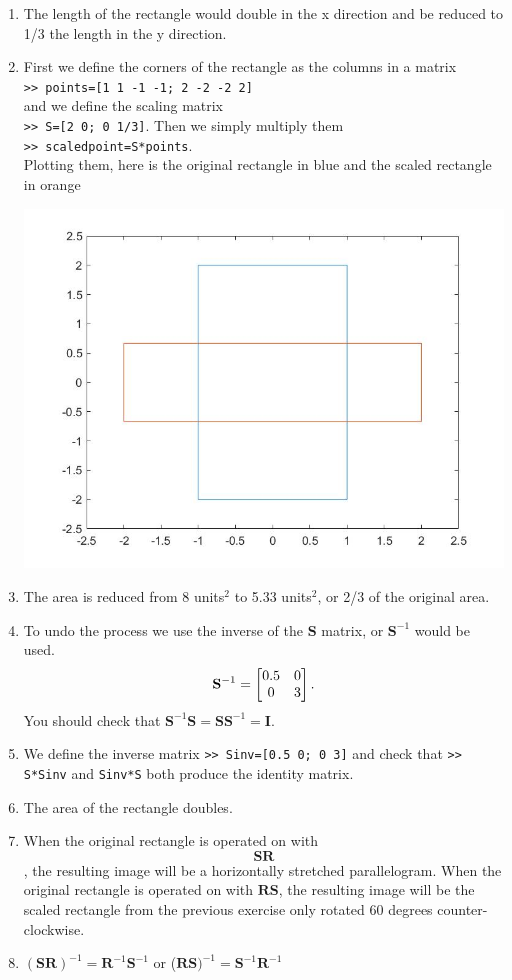 \begin{sol}
	\begin{enumerate}
		\item The length of the rectangle would double in the x direction and be reduced to 1/3 the length in the y direction.
		\item First we define the corners of the rectangle as the columns in a matrix\\
		{\centering \texttt{>> points=[1 1 -1 -1; 2 -2 -2 2]}}\\
		and we define the scaling matrix\\
		{\centering \texttt{>> S=[2 0; 0 1/3]}.}
		Then we simply multiply them\\
		{\centering \texttt{>> scaledpoint=S*points}.}\\
		Plotting them, here is the original rectangle in blue and the scaled rectangle in orange
		\begin{center}
		    \includegraphics[scale=.5]{FacesNight2/figs/scaledrec.jpg}
		\end{center}
		\item The area is reduced from 8 units$^2$ to 5.33 units$^2$, or 2/3 of the original area.
		\item To undo the process we use the inverse of the $\mathbf{S}$ matrix, or $\mathbf{S}^{-1}$ would be used. \[ \mathbf{S}^{-1} = \begin{bmatrix} 0.5 & 0 \\ 0 & 3\end{bmatrix}. \]
		You should check that $\mathbf{S}^{-1}\mathbf{S} = \mathbf{SS}^{-1} = \mathbf{I}$.
		\item We define the inverse matrix
		{\centering \texttt{>> Sinv=[0.5 0; 0 3]}}
		and check that \texttt{>> S*Sinv} and \texttt{Sinv*S} both produce the identity matrix.
		\item The area of the rectangle doubles.
		\item When the original rectangle is operated on with $$\mathbf{SR}$$, the resulting image will be a horizontally stretched parallelogram. When the original rectangle is operated on with $\mathbf{RS}$, the resulting image will be the scaled rectangle from the previous exercise only rotated 60 degrees counter-clockwise.
		\item $(\mathbf{SR})^{-1}=\mathbf{R}^{-1}\mathbf{S}^{-1}$ or ($\mathbf{RS})^{-1}=\mathbf{S}^{-1}\mathbf{R}^{-1}$
	\end{enumerate}
\end{sol}
